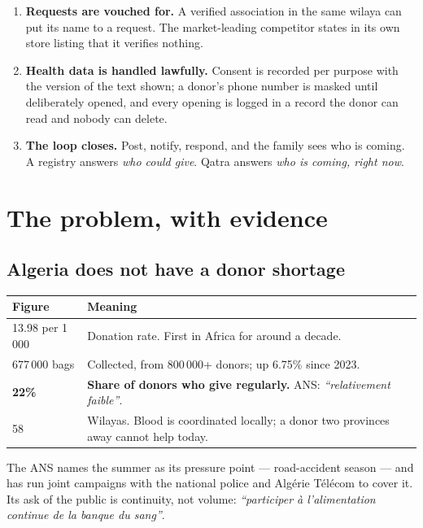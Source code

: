 \documentclass[11pt,a4paper]{article}
\begin{document}
\begin{enumerate}[leftmargin=1.4em]
  \item \textbf{Requests are vouched for.} A verified association in the same
        wilaya can put its name to a request. The market-leading competitor
        states in its own store listing that it verifies nothing.
  \item \textbf{Health data is handled lawfully.} Consent is recorded per
        purpose with the version of the text shown; a donor's phone number is
        masked until deliberately opened, and every opening is logged in a
        record the donor can read and nobody can delete.
  \item \textbf{The loop closes.} Post, notify, respond, and the family sees
        who is coming. A registry answers \emph{who could give}. Qatra answers
        \emph{who is coming, right now}.
\end{enumerate}

\section{The problem, with evidence}

\subsection{Algeria does not have a donor shortage}

\begin{center}
\begin{tabularx}{\textwidth}{lX}
\toprule
\textbf{Figure} & \textbf{Meaning} \\
\midrule
13.98 per 1\,000 & Donation rate. First in Africa for around a decade. \\
677\,000 bags & Collected, from 800\,000+ donors; up 6.75\% since 2023. \\
\textbf{22\%} & \textbf{Share of donors who give regularly.} ANS: \emph{``relativement faible''}. \\
58 & Wilayas. Blood is coordinated locally; a donor two provinces away cannot help today. \\
\bottomrule
\end{tabularx}
\end{center}

The ANS names the summer as its pressure point — road-accident season — and has
run joint campaigns with the national police and Algérie Télécom to cover it.
Its ask of the public is continuity, not volume:
\emph{``participer à l'alimentation continue de la banque du sang''}.
\end{document}
